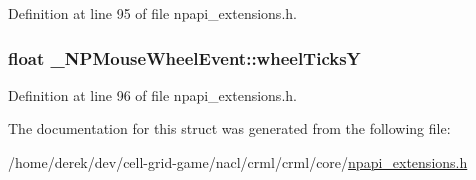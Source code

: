 Definition at line 95 of file npapi\_\-extensions.h.

\hypertarget{struct___n_p_mouse_wheel_event_a49f5b57beb96322c9a3a13e5e064184d}{
\subsubsection[{wheelTicksY}]{\setlength{\rightskip}{0pt plus 5cm}float {\bf \_\-NPMouseWheelEvent::wheelTicksY}}}
\label{struct___n_p_mouse_wheel_event_a49f5b57beb96322c9a3a13e5e064184d}


Definition at line 96 of file npapi\_\-extensions.h.



The documentation for this struct was generated from the following file:\begin{DoxyCompactItemize}
\item 
/home/derek/dev/cell-\/grid-\/game/nacl/crml/crml/core/\hyperlink{npapi__extensions_8h}{npapi\_\-extensions.h}\end{DoxyCompactItemize}
